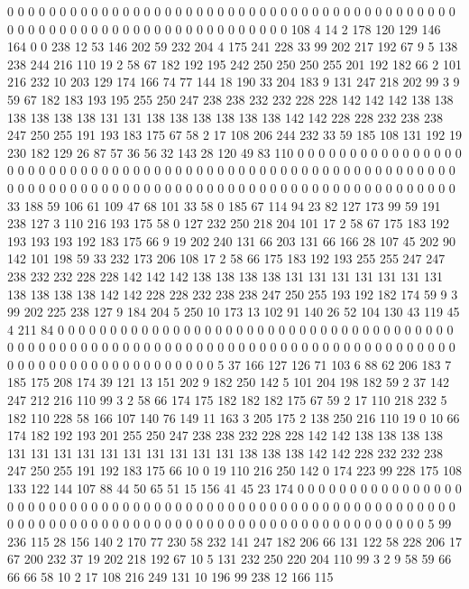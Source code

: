 0 0 0 0 0 0 0 0 0 0 0 0 0 0 0 0 0 0 0 0
0 0 0 0 0 0 0 0 0 0 0 0 0 0 0 0 0 0 0 0
0 0 0 0 0 0 0 0 0 0 0 0 0 0 0 0 0 0 0 0
0 0 0 0 0 0 0 0 0 0 108 4 14 2 178 120 129 146 164 0
0 238 12 53 146 202 59 232 204 4 175 241 228 33 99 202 217 192 67 9
5 138 238 244 216 110 19 2 58 67 182 192 195 242 250 250 250 255 201 192
182 66 2 101 216 232 10 203 129 174 166 74 77 144 18 190 33 204 183 9
131 247 218 202 99 3 9 59 67 182 183 193 195 255 250 247 238 238 232 232
228 228 142 142 142 138 138 138 138 138 138 131 131 138 138 138 138 138 138 142
142 228 228 232 238 238 247 250 255 191 193 183 175 67 58 2 17 108 206 244
232 33 59 185 108 131 192 19 230 182 129 26 87 57 36 56 32 143 28 120
49 83 110 0 0 0 0 0 0 0 0 0 0 0 0 0 0 0 0 0
0 0 0 0 0 0 0 0 0 0 0 0 0 0 0 0 0 0 0 0
0 0 0 0 0 0 0 0 0 0 0 0 0 0 0 0 0 0 0 0
0 0 0 0 0 0 0 0 0 0 0 0 0 0 0 0 0 0 0 0
0 0 0 0 0 0 0 0 0 0 0 0 0 0 0 0 0 0 0 0
0 0 0 0 0 33 188 59 106 61 109 47 68 101 33 58 0 185 67 114
94 23 82 127 173 99 59 191 238 127 3 110 216 193 175 58 0 127 232 250
218 204 101 17 2 58 67 175 183 192 193 193 193 192 183 175 66 9 19 202
240 131 66 203 131 66 166 28 107 45 202 90 142 101 198 59 33 232 173 206
108 17 2 58 66 175 183 192 193 255 255 247 247 238 232 232 228 228 142 142
142 138 138 138 138 131 131 131 131 131 131 131 138 138 138 138 142 142 228 228
232 238 238 247 250 255 193 192 182 174 59 9 3 99 202 225 238 127 9 184
204 5 250 10 173 13 102 91 140 26 52 104 130 43 119 45 4 211 84 0
0 0 0 0 0 0 0 0 0 0 0 0 0 0 0 0 0 0 0 0
0 0 0 0 0 0 0 0 0 0 0 0 0 0 0 0 0 0 0 0
0 0 0 0 0 0 0 0 0 0 0 0 0 0 0 0 0 0 0 0
0 0 0 0 0 0 0 0 0 0 0 0 0 0 0 0 0 0 0 0
0 0 0 0 0 0 0 0 0 0 0 0 0 0 0 0 0 0 0 0
5 37 166 127 126 71 103 6 88 62 206 183 7 185 175 208 174 39 121 13
151 202 9 182 250 142 5 101 204 198 182 59 2 37 142 247 212 216 110 99
3 2 58 66 174 175 182 182 182 175 67 59 2 17 110 218 232 5 182 110
228 58 166 107 140 76 149 11 163 3 205 175 2 138 250 216 110 19 0 10
66 174 182 192 193 201 255 250 247 238 238 232 228 228 142 142 138 138 138 138
131 131 131 131 131 131 131 131 131 131 138 138 138 142 142 228 232 232 238 247
250 255 191 192 183 175 66 10 0 19 110 216 250 142 0 174 223 99 228 175
108 133 122 144 107 88 44 50 65 51 15 156 41 45 23 174 0 0 0 0
0 0 0 0 0 0 0 0 0 0 0 0 0 0 0 0 0 0 0 0
0 0 0 0 0 0 0 0 0 0 0 0 0 0 0 0 0 0 0 0
0 0 0 0 0 0 0 0 0 0 0 0 0 0 0 0 0 0 0 0
0 0 0 0 0 0 0 0 0 0 0 0 0 0 0 0 0 0 0 0
0 0 0 0 0 0 0 0 0 0 0 0 0 0 0 5 99 236 115 28
156 140 2 170 77 230 58 232 141 247 182 206 66 131 122 58 228 206 17 67
200 232 37 19 202 218 192 67 10 5 131 232 250 220 204 110 99 3 2 9
58 59 66 66 66 58 10 2 17 108 216 249 131 10 196 99 238 12 166 115
